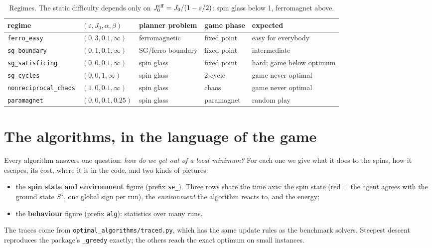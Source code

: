 \documentclass[11pt,a4paper]{article}
\newcommand{\code}[1]{\nolinkurl{#1}}
\begin{document}
\begin{table}[H]\centering\footnotesize
\begin{tabular}{lllll}
\toprule
regime & $(\varepsilon,J_0,\alpha,\beta)$ & planner problem & game phase & expected \\
\midrule
\code{ferro_easy} & $(0,3,0.1,\infty)$ & ferromagnetic & fixed point & easy for everybody \\
\code{sg_boundary} & $(0,1,0.1,\infty)$ & SG/ferro boundary & fixed point & intermediate \\
\code{sg_satisficing} & $(0,0,0.1,\infty)$ & spin glass & fixed point & hard; game below optimum \\
\code{sg_cycles} & $(0,0,1,\infty)$ & spin glass & 2-cycle & game never optimal \\
\code{nonreciprocal_chaos} & $(1,0,0.1,\infty)$ & spin glass & chaos & game never optimal \\
\code{paramagnet} & $(0,0,0.1,0.25)$ & spin glass & paramagnet & random play \\
\bottomrule
\end{tabular}
\caption{Regimes. The static difficulty depends only on $J_0^{\rm eff}=J_0/(1-\varepsilon/2)$: spin glass below 1, ferromagnet above.}
\end{table}

\section{The algorithms, in the language of the game}

Every algorithm answers one question: \emph{how do we get out of a local minimum?} For each one we give what it
does to the spins, how it escapes, its cost, where it is in the code, and two kinds of pictures:
\begin{itemize}
\item the \textbf{spin state and environment} figure (prefix \code{se_}). Three rows share the time axis: the
spin state (red = the agent agrees with the ground state $S^\star$, one global sign per run), the
\emph{environment} the algorithm reacts to, and the energy;
\item the \textbf{behaviour} figure (prefix \code{alg}): statistics over many runs.
\end{itemize}
The traces come from \code{optimal_algorithms/traced.py}, which has the same update rules as the benchmark
solvers. Steepest descent reproduces the package's \code{_greedy} exactly; the others reach the exact optimum
on small instances.
\end{document}
